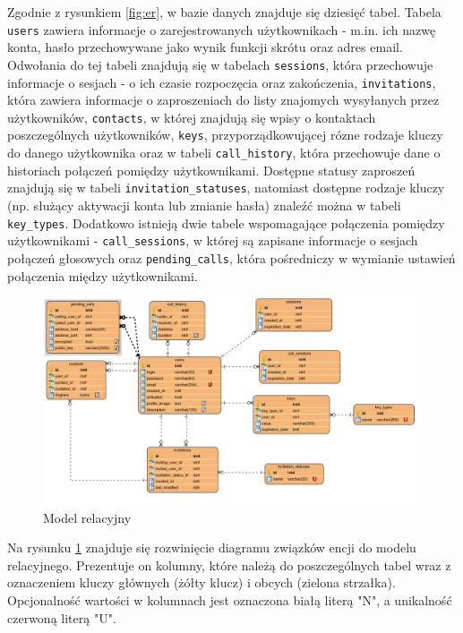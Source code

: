 \documentclass{article}
\begin{document}
    Zgodnie z rysunkiem \ref{fig:er}, w bazie danych znajduje się dziesięć tabel. Tabela \texttt{users} zawiera informacje o zarejestrowanych użytkownikach - m.in. ich nazwę konta, hasło przechowywane jako wynik funkcji skrótu oraz adres email. Odwołania do tej tabeli znajdują się w tabelach \texttt{sessions}, która przechowuje informacje o sesjach - o ich czasie rozpoczęcia oraz zakończenia, \texttt{invitations}, która zawiera informacje o zaproszeniach do listy znajomych wysyłanych przez użytkowników, \texttt{contacts}, w której znajdują się wpisy o kontaktach poszczególnych użytkowników, \texttt{keys}, przyporządkowującej rózne rodzaje kluczy do danego użytkownika oraz w tabeli \texttt{call\_history}, która przechowuje dane o historiach połączeń pomiędzy użytkownikami. Dostępne statusy zaproszeń znajdują się w tabeli \texttt{invitation\_statuses}, natomiast dostępne rodzaje kluczy (np. służący aktywacji konta lub zmianie hasła) znaleźć można w tabeli \texttt{key\_types}. Dodatkowo istnieją dwie tabele wspomagające połączenia pomiędzy użytkownikami - \texttt{call\_sessions}, w której są zapisane informacje o sesjach połączeń głosowych oraz \texttt{pending\_calls}, która pośredniczy w wymianie ustawień połączenia między użytkownikami.

    \begin{figure}[H]
      \centering
        \includegraphics[width=1.0\linewidth]{assets/rel.png}
        \caption[]{Model relacyjny}
        \label{fig:rel}
    \end{figure}

    Na rysunku \ref{fig:rel} znajduje się rozwinięcie diagramu związków encji do modelu relacyjnego. Prezentuje on kolumny, które należą do poszczególnych tabel wraz z oznaczeniem kluczy głównych (żółty klucz) i obcych (zielona strzałka). Opcjonalność wartości w kolumnach jest oznaczona białą literą "N", a unikalność czerwoną literą "U".
\end{document}
